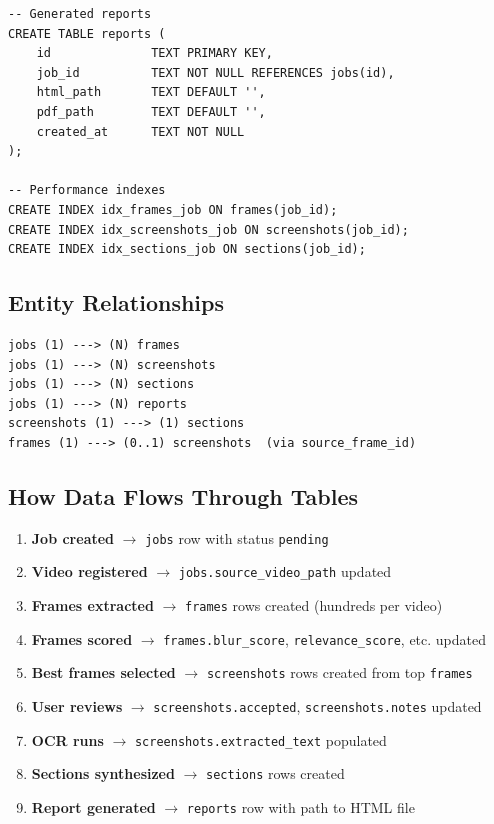 \documentclass[12pt, a4paper]{article}
\newcommand{\codeinline}[1]{\texttt{\small\colorbox{codebg}{#1}}}
\begin{document}
\begin{lstlisting}[style=sql]
-- Generated reports
CREATE TABLE reports (
    id              TEXT PRIMARY KEY,
    job_id          TEXT NOT NULL REFERENCES jobs(id),
    html_path       TEXT DEFAULT '',
    pdf_path        TEXT DEFAULT '',
    created_at      TEXT NOT NULL
);

-- Performance indexes
CREATE INDEX idx_frames_job ON frames(job_id);
CREATE INDEX idx_screenshots_job ON screenshots(job_id);
CREATE INDEX idx_sections_job ON sections(job_id);
\end{lstlisting}

\subsection{Entity Relationships}

\begin{lstlisting}[style=plain]
jobs (1) ---> (N) frames
jobs (1) ---> (N) screenshots
jobs (1) ---> (N) sections
jobs (1) ---> (N) reports
screenshots (1) ---> (1) sections
frames (1) ---> (0..1) screenshots  (via source_frame_id)
\end{lstlisting}

\subsection{How Data Flows Through Tables}

\begin{enumerate}
    \item \textbf{Job created} $\rightarrow$ \codeinline{jobs} row with status \codeinline{pending}
    \item \textbf{Video registered} $\rightarrow$ \codeinline{jobs.source\_video\_path} updated
    \item \textbf{Frames extracted} $\rightarrow$ \codeinline{frames} rows created (hundreds per video)
    \item \textbf{Frames scored} $\rightarrow$ \codeinline{frames.blur\_score}, \codeinline{relevance\_score}, etc. updated
    \item \textbf{Best frames selected} $\rightarrow$ \codeinline{screenshots} rows created from top \codeinline{frames}
    \item \textbf{User reviews} $\rightarrow$ \codeinline{screenshots.accepted}, \codeinline{screenshots.notes} updated
    \item \textbf{OCR runs} $\rightarrow$ \codeinline{screenshots.extracted\_text} populated
    \item \textbf{Sections synthesized} $\rightarrow$ \codeinline{sections} rows created
    \item \textbf{Report generated} $\rightarrow$ \codeinline{reports} row with path to HTML file
\end{enumerate}
\end{document}
